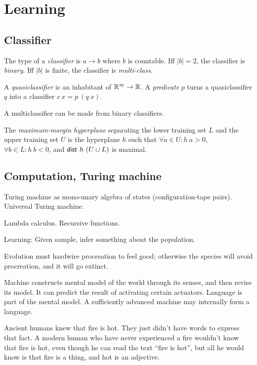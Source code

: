 \chapter{Learning}

\section{Classifier}

%
%
%
The type of a \emph{classifier} is \(a \to b\) where \(b\) is countable.
Iff \(|b| = 2\), the classifier is \emph{binary}.
Iff \(|b|\) is finite, the classifier is \emph{multi-class}.

A \emph{quasiclassifier} is an inhabitant of \(\mathbb{R}^\infty \to \mathbb{R}\).
A \emph{predicate} \(p\) turns a quasiclassifier \(q\) into a classifier \(c~x = p~(q~x)\).

A multiclassifier can be made from binary classifiers.

%
%
The \emph{maximum-margin hyperplane} separating
the lower training set \(L\) and the upper training set \(U\)
is the hyperplane \(h\)
such that
\(\forall a \in U : h~a > 0\),
\,\(\forall b \in L : h~b < 0\),
and \(\textsf{dist}~h~(U \cup L)\) is maximal.

\section{Computation, Turing machine}

Turing machine as mono-unary algebra of states (configuration-tape pairs).
Universal Turing machine.

Lambda calculus.
Recursive functions.

Learning:
Given sample, infer something about the population.

Evolution must hardwire procreation to feel good;
otherwise the species will avoid procreation,
and it will go extinct.

Machine constructs mental model of the world through its senses,
and then revise its model.
It can predict the result of activating certain actuators.
Language is part of the mental model.
A sufficiently advanced machine may internally form a language.

Ancient humans knew that fire is hot.
They just didn't have words to express that fact.
A modern human who have never experienced a fire
wouldn't know that fire is hot,
even though he can read the text ``fire is hot'',
but all he would know is that fire is a thing, and hot is an adjective.

